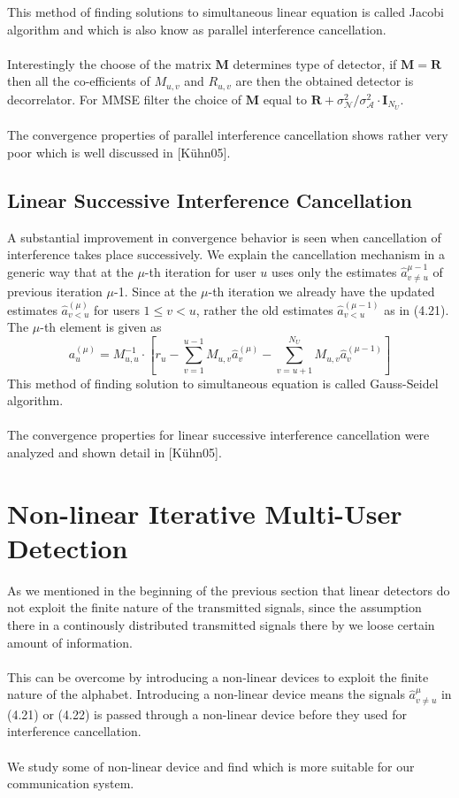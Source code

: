This method of finding solutions to simultaneous linear equation is called Jacobi algorithm and which is also know as parallel interference cancellation.\\ \\
Interestingly the choose of the matrix $\mathrm{\mathbf{M}}$ determines type of detector, if $\mathrm{\mathbf{M}}=\mathrm{\mathbf{R}}$ then all the co-efficients of $M_{u,v}$ and $R_{u,v}$ are then the obtained detector is decorrelator. For MMSE filter the choice of $\mathrm{\mathbf{M}}$ equal to $\mathrm{\mathbf{R}}+\sigma_{\mathcal{N}}^{2}/\sigma_{\mathcal{A}}^{2}\cdot\mathrm{\mathbf{I}}_{N_U}$. \\ \\
The convergence properties of parallel interference cancellation shows rather very poor which is well discussed in [K\"uhn05].
\subsection{Linear Successive Interference Cancellation}
A substantial improvement in convergence behavior is seen when cancellation of interference takes place successively. We explain the cancellation mechanism in a generic way that at the $\mu$-th iteration for user $u$ uses only the estimates $\hat{a}_{v\ne u}^{\mu-1}$ of previous iteration $\mu$-1. Since at the $\mu$-th iteration we already have the updated estimates $\hat{a}_{v<u}^{(\mu)}$ for users $1\leq v < u$, rather the old estimates $\hat{a}_{v<u}^{(\mu-1)}$ as in (4.21).  The $\mu$-th element is given as 
\begin{equation}
a_u^{(\mu)}=M_{u,u}^{-1}\cdot \left[r_u-\sum\limits_{v=1}^{u-1}M_{u,v}\hat{a}_v^{(\mu)}-\sum\limits_{v=u+1}^{N_U}M_{u,v}\hat{a}_v^{(\mu-1)}\right]
\end{equation}
This method of finding solution to simultaneous equation is called Gauss-Seidel algorithm.\\ \\
The convergence properties for linear successive interference cancellation were analyzed and shown detail in [K\"uhn05].
\section{Non-linear Iterative Multi-User Detection}
As we mentioned in the beginning of the previous section that linear detectors do not exploit the finite nature of the transmitted signals, since the assumption there in a continously distributed transmitted signals there by we loose certain amount of information. \\ \\
This can be overcome by introducing a non-linear devices to exploit the finite nature of the alphabet. Introducing a non-linear device means the signals $\hat{a}_{v\ne u}^{\mu}$ in (4.21) or (4.22) is passed through a non-linear device before they used for interference cancellation. \\ \\
We study some of non-linear device and find which is more suitable for our communication system.
